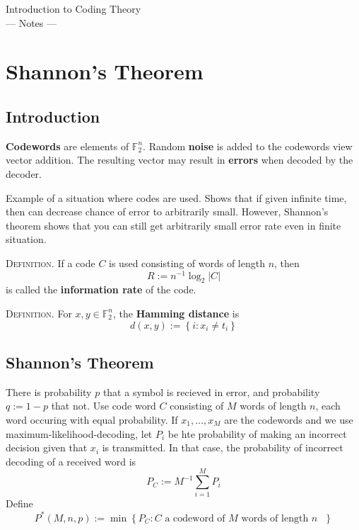 \documentclass{article}
\renewcommand{\tt}[1]{\text{ #1 }}
\newcommand{\F}{\mathbb{F}}
\renewcommand{\=}{\equiv}
\renewcommand{\i}{^{-1}}
\newcommand{\set}[1]{\left\{ #1 \right\}}
\newcommand{\header}[1]{\vspace{1em}\noindent\textsc{#1.} }
\begin{document}
\begin{center}
  {\huge\sc Introduction to Coding Theory}\\[2em]
  {\Large --- Notes ---}
\end{center}

\vspace{4em}

\setcounter{section}{1}
\section{Shannon's Theorem}

\subsection{Introduction}

\textbf{Codewords} are elements of $\F_2^n$.
Random \textbf{noise} is added to the codewords view vector addition.
The resulting vector may result in \textbf{errors} when decoded by the decoder.

Example of a situation where codes are used. Shows that if given infinite time, then can decrease chance of error to arbitrarily small. However, Shannon's theorem shows that you can still get arbitrarily small error rate even in finite situation.

\header{Definition}
If a code $C$ is used consisting of words of length $n$, then
$$ R := n\i \log_2 |C| $$
is called the \textbf{information rate} of the code.

\header{Definition}
For $x,y \in \F_2^n$, the \textbf{Hamming distance} is
$$ d(x,y) := \set{ i : x_i \neq t_i } $$

\subsection{Shannon's Theorem}

There is probability $p$ that a symbol is recieved in error, and probability $q := 1 - p$ that not.
Use code word $C$ consisting of $M$ words of length $n$, each word occuring with equal probability.
If $x_1, \dots, x_M$ are the codewords and we use maximum-likelihood-decoding, let $P_i$ be hte probability of making an incorrect decision given that $x_i$ is transmitted. In that case, the probability of incorrect decoding of a received word is
$$ P_C := M\i \sum_{i=1}^M P_i $$
Define
$$ P^*(M, n, p) := \min\set{ P_C : C \tt{a codeword of $M$ words of length $n$} } $$
\end{document}
